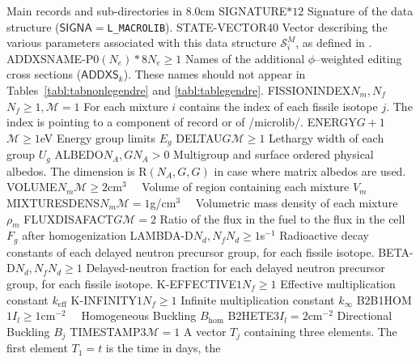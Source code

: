 \begin{DescriptionEnregistrement}{Main records and sub-directories in }{8.0cm}
\CharEnr
  {SIGNATURE}{$*12$}
  {Signature of the  data structure ($\mathsf{SIGNA}=${\tt L\_MACROLIB}).}
\IntEnr
  {STATE-VECTOR}{$40$}
  {Vector describing the various parameters associated with this data structure
  $\mathcal{S}^{M}_{i}$, as defined in .}
\OptCharEnr
  {ADDXSNAME-P0}{$(N_{e})*8$}{$N_{e} \ge 1$}
  {Names of the additional $\phi$--weighted editing cross sections ($\mathsf{ADDXS}_k$).
  These names should not appear in Tables~\ref{tabl:tabnonlegendre} and \ref{tabl:tablegendre}.}
\OptIntEnr
  {FISSIONINDEX}{$N_{m},N_{f}$}{$N_{f} \ge 1,\mathcal{M}=1$}
  {For each mixture $i$ contains the index of each fissile isotope $j$. The index is
   pointing to a component of record  or 
   of /microlib/.}
\OptRealEnr
  {ENERGY}{$G+1$}{$\mathcal{M}\ge 1$}{eV}
  {Energy group limits $E_{g}$}
\OptRealEnr
  {DELTAU}{$G$}{$\mathcal{M}\ge 1$}{}
  {Lethargy width of each group $U_{g}$}
\OptRealEnr
  {ALBEDO}{$N_{A}, G$}{$N_{A}> 0$}{}
  {Multigroup and surface ordered physical albedos. The dimension is R$(N_{A},G,G)$ in case where matrix albedos are used.}
\OptRealEnr
  {VOLUME}{$N_{m}$}{$\mathcal{M}\ge 2$}{cm$^{3}$~~}
  {Volume of region containing each mixture $V_{m}$}
\OptRealEnr
  {MIXTURESDENS}{$N_{m}$}{$\mathcal{M}=1$}{g/cm$^{3}$~~}
  {Volumetric mass density of each mixture $\rho_{m}$}  
\OptRealEnr
  {FLUXDISAFACT}{$G$}{$\mathcal{M}=2$}{}
  {Ratio of the flux in the fuel to the flux in the cell $F_{g}$ after homogenization}
\OptRealEnr
  {LAMBDA-D}{$N_{d},N_{f}$}{$N_{d}\ge 1$}{s$^{-1}$}
  {Radioactive decay constants of each delayed neutron precursor group, for each
  fissile isotope.}
\OptRealEnr
  {BETA-D}{$N_{d},N_{f}$}{$N_{d}\ge 1$}{}
  {Delayed-neutron fraction for each delayed neutron precursor group, for each
  fissile isotope.}
\OptRealEnr
  {K-EFFECTIVE}{$1$}{$N_{f} \ge 1$}{}
  {Effective multiplication constant $k_{\mathrm{eff}}$}
\OptRealEnr
  {K-INFINITY}{$1$}{$N_{f} \ge 1$}{}
  {Infinite multiplication constant $k_{\infty}$}
\OptRealEnr
  {B2B1HOM}{$1$}{$I_{l} \ge 1$}{cm$^{-2}$~~}
  {Homogeneous Buckling $B_{\mathrm{hom}}$}
\OptRealEnr
  {B2HETE}{$3$}{$I_{l}=2$}{cm$^{-2}$}
  {Directional Buckling $B_{j}$}
\OptRealEnr
  {TIMESTAMP}{$3$}{$\mathcal{M}=1$}{}
  {A vector $T_{j}$ containing three elements. The first element $T_{1}=t$ is the time in days, the
}
\end{DescriptionEnregistrement}
